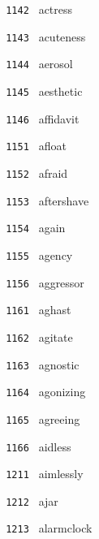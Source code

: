\documentclass[11pt]{article}
\begin{document}
\begin{multicols}{6}
\noindent \texttt{ 1142 } \hspace{1mm} actress  \par
\noindent \texttt{ 1143 } \hspace{1mm} acuteness  \par
\noindent \texttt{ 1144 } \hspace{1mm} aerosol  \par
\noindent \texttt{ 1145 } \hspace{1mm} aesthetic  \par
\noindent \texttt{ 1146 } \hspace{1mm} affidavit  \par
\noindent \texttt{ 1151 } \hspace{1mm} afloat  \par
\noindent \texttt{ 1152 } \hspace{1mm} afraid  \par
\noindent \texttt{ 1153 } \hspace{1mm} aftershave  \par
\noindent \texttt{ 1154 } \hspace{1mm} again  \par
\noindent \texttt{ 1155 } \hspace{1mm} agency  \par
\noindent \texttt{ 1156 } \hspace{1mm} aggressor  \par
\noindent \texttt{ 1161 } \hspace{1mm} aghast  \par
\noindent \texttt{ 1162 } \hspace{1mm} agitate  \par
\noindent \texttt{ 1163 } \hspace{1mm} agnostic  \par
\noindent \texttt{ 1164 } \hspace{1mm} agonizing  \par
\noindent \texttt{ 1165 } \hspace{1mm} agreeing  \par
\noindent \texttt{ 1166 } \hspace{1mm} aidless  \par
\noindent \texttt{ 1211 } \hspace{1mm} aimlessly  \par
\noindent \texttt{ 1212 } \hspace{1mm} ajar  \par
\noindent \texttt{ 1213 } \hspace{1mm} alarmclock  \par

\end{multicols}
\end{document}
